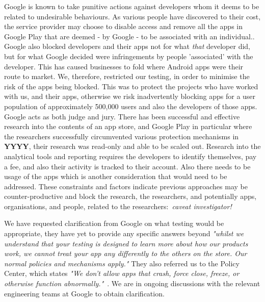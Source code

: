 Google is known to take punitive actions against developers whom it deems to be related to undesirable behaviours. 
As various people have discovered to their cost, the service provider may choose to disable access and remove all the apps in Google Play that are deemed - by Google - to be associated with an individual.\cite{Martinez_2019}. Google also blocked developers and their apps not for what \emph{that} developer did, but for what Google decided were infringements by people 'associated' with the developer. This has caused businesses to fold where Android apps were their route to market\cite{Martinez_2019, mark_dodson_medium_story}. We, therefore, restricted our testing, in order to minimise the risk of the apps being blocked. This was to protect the projects who have worked with us, and their apps, otherwise we risk inadvertently blocking apps for a user population of approximately 500,000 users and also the developers of those apps. Google acts as both judge and jury. There has been successful and effective research into the contents of an app store, and Google Play in particular where the researchers successfully circumvented various protection mechanisms in \textbf{YYYY}, 
their research was read-only and able to be scaled out. Research into the analytical tools and reporting requires the developers to identify themselves, pay a fee, and also their activity is tracked to their account. Also there needs to be usage of the apps which is another consideration that would need to be addressed. These constraints and factors indicate previous approaches may be counter-productive and block the research, the researchers, and potentially apps, organisations, and people, related to the researchers:~\emph{caveat investigator!}



We have requested clarification from Google on what testing would be appropriate, they have yet to provide any specific answers beyond \emph{"whilst we understand that your testing is designed to learn more about how our products work, we cannot treat your app any differently to the others on the store. Our normal policies and mechanisms apply."} They also referred us to the Policy Center, which states \emph{"We don’t allow apps that crash, force close, freeze, or otherwise function abnormally."}~\cite{google_play_policy_center_broken_functionality}. We are in ongoing discussions with the relevant engineering teams at Google to obtain clarification.

